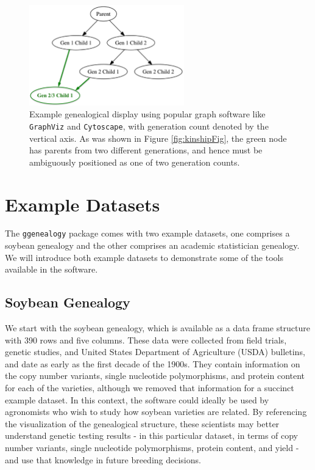 \documentclass[11pt,a4paper,oldfontcommands,openany]{memoir}
\numberwithin{equation}{section} %
\newcommand{\pkg}[1]{{\texttt{#1}}}
\begin{document}
\begin{figure}[H]
    \centering
    \includegraphics[width=0.6\textwidth]{Graph}
    \caption{Example genealogical display using popular graph software like \pkg{GraphViz} and \pkg{Cytoscape}, with generation count denoted by the vertical axis. As was shown in Figure \ref{fig:kinshipFig}, the green node has parents from two different generations, and hence must be ambiguously positioned as one of two generation counts.}
    \label{fig:Graph}
\end{figure}

\section{Example Datasets}
\label{exData}

The \pkg{ggenealogy} package comes with two example datasets, one comprises a soybean genealogy and the other comprises an academic statistician genealogy. We will introduce both example datasets to demonstrate some of the tools available in the software.

\subsection{Soybean Genealogy}

We start with the soybean genealogy, which is available as a data frame structure with 390 rows and five columns. These data were collected from field trials, genetic studies, and United States Department of Agriculture (USDA) bulletins, and date as early as the first decade of the 1900s. They contain information on the copy number variants, single nucleotide polymorphisms, and protein content for each of the varieties, although we removed that information for a succinct example dataset. In this context, the software could ideally be used by agronomists who wish to study how soybean varieties are related. By referencing the visualization of the genealogical structure, these scientists may better understand genetic testing results - in this particular dataset, in terms of copy number variants, single nucleotide polymorphisms, protein content, and yield - and use that knowledge in future breeding decisions.
\end{document}
